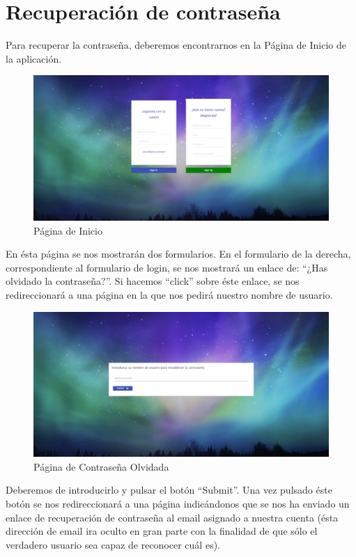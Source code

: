 \documentclass[11pt,openany]{book}
\begin{document}
\section{Recuperación de contraseña}

Para recuperar la contraseña, deberemos encontrarnos en la Página de Inicio de la aplicación.

\begin{figure}[H]
\centering
\includegraphics[totalheight=7cm]{manualUsuario/paginaInicio.png}
\caption{Página de Inicio}
\end{figure}

En ésta página se nos mostrarán dos formularios. En el formulario de la derecha, correspondiente al formulario de login, se nos mostrará un enlace de: ``¿Has olvidado la contraseña?''. Si hacemos ``click'' sobre éste enlace, se nos redireccionará a una página en la que nos pedirá nuestro nombre de usuario.

\begin{figure}[H]
\centering
\includegraphics[totalheight=7cm]{manualUsuario/contrase_aOlvidada.png}
\caption{Página de Contraseña Olvidada}
\end{figure}

Deberemos de introducirlo y pulsar el botón ``Submit''. Una vez pulsado éste botón se nos redireccionará a una página indicándonos que se nos ha enviado un enlace de recuperación de contraseña al email asignado a nuestra cuenta (ésta dirección de email ira oculto en gran parte con la finalidad de que sólo el verdadero usuario sea capaz de reconocer cuál es).
\end{document}
